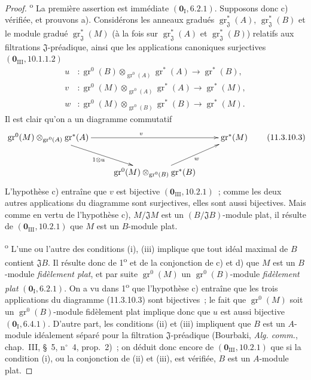\begin{proof}
\textsuperscript{o} La première assertion est immédiate
$(\mathbf 0_{\mathrm I},6.2.1)$. Supposons donc c) vérifiée, et prouvons a).
Considérons les anneaux gradués $\operatorname{gr}_{\mathfrak J}^*(A)$,
$\operatorname{gr}_{\mathfrak J}^*(B)$ et le module gradué
$\operatorname{gr}_{\mathfrak J}^*(M)$ (à la fois sur
$\operatorname{gr}_{\mathfrak J}^*(A)$ et
$\operatorname{gr}_{\mathfrak J}^*(B)$) relatifs aux filtrations
$\mathfrak J$-préadique, ainsi que les applications canoniques surjectives
$(\mathbf 0_{\mathrm{III}},10.1.1.2)$
\begin{align*}
u&:\operatorname{gr}^0(B)\otimes_{\operatorname{gr}^0(A)}
   \operatorname{gr}^*(A)\longrightarrow\operatorname{gr}^*(B),\\
v&:\operatorname{gr}^0(M)\otimes_{\operatorname{gr}^0(A)}
   \operatorname{gr}^*(A)\longrightarrow\operatorname{gr}^*(M),\\
w&:\operatorname{gr}^0(M)\otimes_{\operatorname{gr}^0(B)}
   \operatorname{gr}^*(B)\longrightarrow\operatorname{gr}^*(M).
\end{align*}
Il est clair qu'on a un diagramme commutatif
\begin{equation}
\xymatrix{
\operatorname{gr}^0(M)\otimes_{\operatorname{gr}^0(A)}\operatorname{gr}^*(A)
 \ar[rr]^v \ar[dr]_{1\otimes u} && \operatorname{gr}^*(M) \\
& \operatorname{gr}^0(M)\otimes_{\operatorname{gr}^0(B)}
  \operatorname{gr}^*(B) \ar[ur]_w &
}
\label{IV.11.3.10.3-fr}
\tag{11.3.10.3}
\end{equation}
L'hypothèse c) entraîne que $v$ est bijective
$(\mathbf 0_{\mathrm{III}},10.2.1)$~; comme les deux autres applications du
diagramme sont surjectives, elles sont aussi bijectives. Mais comme en vertu de
l'hypothèse c), $M/\mathfrak JM$ est un $(B/\mathfrak JB)$-module plat, il
résulte de $(\mathbf 0_{\mathrm{III}},10.2.1)$ que $M$ est un $B$-module plat.

\textsuperscript{o} L'une ou l'autre des conditions (i), (iii)
implique que tout idéal maximal de $B$ contient $\mathfrak JB$. Il résulte donc
de 1\textsuperscript{o} et de la conjonction de c) et d) que $M$ est un
$B$-module \emph{fidèlement plat}, et par suite $\operatorname{gr}^0(M)$ un
$\operatorname{gr}^0(B)$-module \emph{fidèlement plat}
$(\mathbf 0_{\mathrm I},6.2.1)$. On a vu dans 1\textsuperscript{o} que
l'hypothèse c) entraîne que les trois applications du diagramme (11.3.10.3)
sont bijectives~; le fait que $\operatorname{gr}^0(M)$ soit un
$\operatorname{gr}^0(B)$-module fidèlement plat implique donc que $u$ est aussi
bijective $(\mathbf 0_{\mathrm I},6.4.1)$. D'autre part, les conditions (ii) et
(iii) impliquent que $B$ est un $A$-module idéalement séparé pour la filtration
$\mathfrak J$-préadique (Bourbaki, \emph{Alg. comm.}, chap.~III, \S~5,
n$^\circ$~4, prop.~2)~; on déduit donc encore de
$(\mathbf 0_{\mathrm{III}},10.2.1)$ que si la condition (i), ou la conjonction
de (ii) et (iii), est vérifiée, $B$ est un $A$-module plat.


\end{proof}
